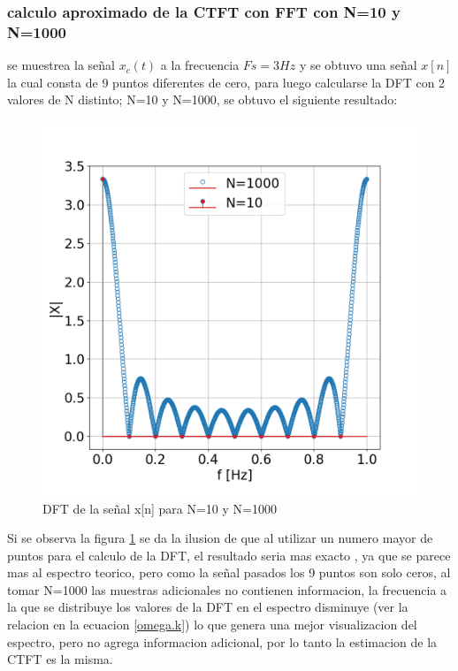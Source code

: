 \documentclass[11pt,a4paper]{article}
\begin{document}
 \subsubsection*{calculo aproximado de la CTFT con FFT con N=10 y N=1000}
 se muestrea la señal $x_{c}(t)$ a la frecuencia $Fs=3 Hz$ y se obtuvo una señal $x[n]$ la cual consta de 9 puntos diferentes de cero, para luego calcularse la DFT con 2 valores de N distinto; N=10 y N=1000, se obtuvo el siguiente resultado:
 \begin{figure}
 \centering
     \includegraphics[width=\textwidth]{Img/punto_4_e.png}
     \caption{DFT de la señal x[n] para N=10 y N=1000}
     \label{fig.4e}
 \end{figure} 
 Si se observa la figura \ref{fig.4e} se da la ilusion de que al utilizar un numero mayor de puntos para el calculo de la DFT, el resultado seria mas exacto , ya que se parece mas al espectro teorico, pero como la señal pasados los 9 puntos son solo ceros, al tomar N=1000 las muestras adicionales no contienen informacion, la frecuencia a la que se distribuye los valores de la DFT en el espectro disminuye (ver la relacion en la ecuacion \ref{omega.k})
 lo que genera una mejor visualizacion del espectro, pero no agrega informacion adicional, por lo tanto la estimacion de la CTFT es la misma.
\end{document}
